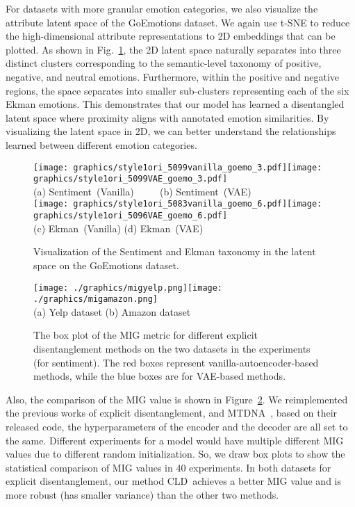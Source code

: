 \documentclass[11pt,a4paper]{article}
\newcommand{\Mname}{CLD}
\renewcommand{\cite}{\citep}
\begin{document}
For datasets with more granular emotion categories, we also visualize the attribute latent space of the GoEmotions dataset. We  again use t-SNE to reduce the high-dimensional attribute representations to 2D embeddings that can be plotted.  As shown in Fig.~\ref{fig:goemo_vis}, the 2D latent space naturally separates into three distinct clusters corresponding to the semantic-level taxonomy of positive, negative, and neutral emotions. Furthermore, within the positive and negative regions, the space separates into smaller sub-clusters representing each of the six Ekman emotions. This demonstrates that our model has learned a disentangled latent space where proximity aligns with annotated emotion similarities. By visualizing the latent space in 2D, we can better understand the relationships learned between different emotion categories.

 

\begin{figure}
    \centering
    \texttt{[image: graphics/style1ori\_5099vanilla\_goemo\_3.pdf]}\texttt{[image: graphics/style1ori\_5099VAE\_goemo\_3.pdf]}\\
    (a) Sentiment~(Vanilla) ~~~~  (b)  Sentiment~(VAE)\\
    \texttt{[image: graphics/style1ori\_5083vanilla\_goemo\_6.pdf]}\texttt{[image: graphics/style1ori\_5096VAE\_goemo\_6.pdf]}\\
    (c) Ekman~(Vanilla)  \qquad (d)  Ekman~(VAE)\\
    \caption{Visualization of the Sentiment and Ekman taxonomy in the latent space on the GoEmotions dataset. }
    \label{fig:goemo_vis}
\end{figure}

\begin{figure}[!t]
    \centering 
    \texttt{[image: ./graphics/migyelp.png]}\texttt{[image: ./graphics/migamazon.png]}\\
    (a) Yelp dataset \qquad (b) Amazon dataset
    \caption{The box plot of the MIG metric for different explicit disentanglement methods on the two datasets in the experiments (for sentiment). The red boxes represent vanilla-autoencoder-based methods, while the blue boxes are for VAE-based methods.}
    \label{fig:boxex} 
\end{figure}

   
Also, the comparison of the MIG value is shown in Figure~\ref{fig:boxex}. We reimplemented the previous works of explicit disentanglement, \cite{john-etal-2019-disentangled} and MTDNA~\cite{sha2021multi}, based on their released code, the hyperparameters of the encoder and the decoder are all set to the same. Different experiments for a model would have multiple different MIG values due to different random initialization. So, we draw box plots to show the statistical comparison of MIG values in 40 experiments. In both datasets for explicit disentanglement, our method \Mname\ achieves a better MIG value and is more robust (has smaller variance) than the other two methods.
\end{document}
